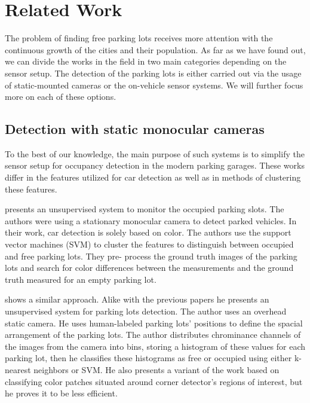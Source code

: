 \chapter{Related Work}
\label{cha:related_works}

The problem of finding free parking lots receives more attention with the
continuous growth of the cities and their population. As far as we have found
out, we can divide the works in the field in two main categories depending on
the sensor setup. The detection of the parking lots is either carried out via
the usage of static-mounted cameras or the on-vehicle sensor systems. We will
further focus more on each of these options.

\section{Detection with static monocular cameras} %
\label{sec:detection_with_monocular_cameras}

To the best of our knowledge, the main purpose of such systems is to simplify
the sensor setup for occupancy detection in the modern parking garages. These
works differ in the features utilized for car detection as well as in methods
of clustering these features.

\citet{qizhang06} presents an unsupervised system to monitor the occupied
parking slots. The authors were using a stationary monocular camera to detect
parked vehicles. In their  work, car detection is solely
based on color. The authors use the support vector machines (SVM) to cluster
the features to distinguish between occupied and free parking lots. They pre-
process the ground truth images of the parking lots and search for color
differences between the measurements and the ground truth measured for an
empty parking lot.

\citet{nicolastrue} shows a similar approach. Alike with the previous papers he
presents an unsupervised system for parking lots detection. The author uses an
overhead static camera. He uses human-labeled parking lots' positions to
define the spacial arrangement of the parking lots. The author distributes
chrominance channels of the images from the camera into bins, storing a
histogram of these values for each parking lot, then he classifies these
histograms as free or occupied using either k-nearest neighbors or SVM\@. He
also presents a variant of the work based on classifying color patches
situated around corner detector's regions of interest, but he proves it to be
less efficient.

